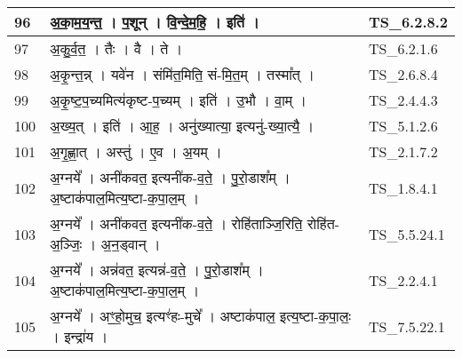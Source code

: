 \documentclass[17pt]{extarticle}
\begin{document}
\begin{longtable}{||p{0.4in}||p{4.9in}||p{0.9in}||}
    \hline
        
    96 & अ॒का॒म॒य॒न्त॒   ।   प॒शून्   ।   वि॒न्दे॒म॒हि॒   ।   इति॑   ।    & TS\_6.2.8.2       \\
    
    \hline
        
    97 & अ॒कु॒र्व॒त॒   ।   तैः   ।   वै   ।   ते   ।    & TS\_6.2.1.6       \\
    
    \hline
        
    98 & अ॒कृ॒न्त॒न्न्   ।   यवे॑न   ।   संमि॑त॒मिति॒ सं{-}मि॒त॒म्   ।   तस्मा᳚त्   ।    & TS\_2.6.8.4       \\
    
    \hline
        
    99 & अ॒कृ॒ष्ट॒प॒च्यमित्य॑कृष्ट{-}प॒च्यम्   ।   इति॑   ।   उ॒भौ   ।   वा॒म्   ।    & TS\_2.4.4.3       \\
    
    \hline
        
    100 & अ॒ख्य॒त्   ।   इति॑   ।   आ॒ह॒   ।   अनु॑ख्यात्या॒ इत्यनु॑{-}ख्या॒त्यै॒   ।    & TS\_5.1.2.6       \\
    
    \hline
        
    101 & अ॒गृ॒ह्णा॒त्   ।   अस्तु॑   ।   ए॒व   ।   अ॒यम्   ।    & TS\_2.1.7.2       \\
    
    \hline
        
    102 & अ॒ग्नये᳚   ।   अनी॑कवत॒ इत्यनी॑क{-}व॒ते॒   ।   पु॒रो॒डाश᳚म्   ।   अ॒ष्टाक॑पाल॒मित्य॒ष्टा{-}क॒पा॒ल॒म्   ।    & TS\_1.8.4.1       \\
    
    \hline
        
    103 & अ॒ग्नये᳚   ।   अनी॑कवत॒ इत्यनी॑क{-}व॒ते॒   ।   रोहि॑ताञ्जि॒रिति॒ रोहि॑त{-}अ॒ञ्जिः॒   ।   अ॒न॒ड्वान्   ।    & TS\_5.5.24.1       \\
    
    \hline
        
    104 & अ॒ग्नये᳚   ।   अन्न॑वत॒ इत्यन्न॑{-}व॒ते॒   ।   पु॒रो॒डाश᳚म्   ।   अ॒ष्टाक॑पाल॒मित्य॒ष्टा{-}क॒पा॒ल॒म्   ।    & TS\_2.2.4.1       \\
    
    \hline
        
    105 & अ॒ग्नये᳚   ।   अꣳ॒॒हो॒मुच॒ इत्यꣳ॑हः{-}मुचे᳚   ।   अष्टाक॑पाल॒ इत्य॒ष्टा{-}क॒पा॒लः॒   ।   इन्द्रा॑य   ।    & TS\_7.5.22.1       \\
    

\end{longtable}
\end{document}
